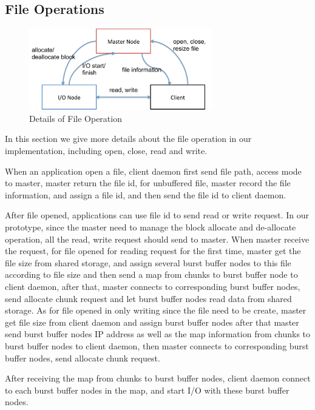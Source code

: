 \subsection{File Operations}

\begin{figure}
\centering
\includegraphics[width=8cm]{img/file_operation}
\caption{Details of File Operation}
\label{implementation:file operation}
\end{figure}

In this section we give more details about the file operation in our implementation, including
open, close, read and write.

When an application open a file, client daemon first send file path, access mode to master,
master return the file id,
for unbuffered file, master record the file information, and assign a file id, and then send the
file id to client daemon.

After file opened, applications can use file id to send read or write request.
In our prototype, since the master need to manage the block allocate and de-allocate operation, all
the read, write request should send to master.
When master receive the request, for file opened for reading
request for the first time, master get the file size from shared storage, and assign several burst
buffer nodes to this file according to file size and then send a map from chunks to burst buffer
node to client daemon, after that, master connects to corresponding burst buffer nodes, send allocate chunk request and
let burst buffer nodes read data from shared storage.
As for file opened in only writing since the file need to be create, master get file size from
client daemon and assign burst buffer nodes after that master send burst buffer nodes IP address as well as the map
information from chunks to burst buffer nodes to client daemon, then master connects to
corresponding burst buffer nodes, send allocate chunk request.

After receiving the map from chunks to burst buffer nodes, client daemon connect to each burst
buffer nodes in the map, and start I/O with these burst buffer nodes.

